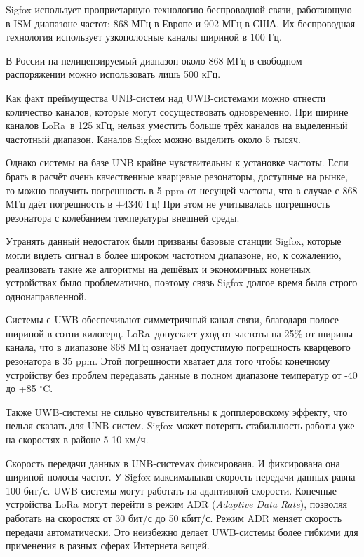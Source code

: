 Sigfox использует проприетарную технологию беспроводной связи, работающую в ISM 
диапазоне частот: 868 МГц в Европе и 902 МГц в США. 
Их беспроводная технология использует узкополосные каналы шириной в 100 Гц.

В России на нелицензируемый диапазон около 868 МГц в свободном распоряжении 
можно использовать лишь 500 кГц.

Как факт преймущества UNB-систем над UWB-системами можно отнести количество 
каналов, которые могут сосуществовать одновременно. При ширине каналов 
LoRa\texttrademark~в 
125 кГц, нельзя уместить больше трёх каналов на выделенный частотный диапазон. 
Каналов Sigfox можно выделить около 5 тысяч.

Однако системы на базе UNB крайне чувствительны к установке частоты. 
Если брать в расчёт очень качественные кварцевые резонаторы, доступные на 
рынке, то можно получить погрешность в 5 ppm от несущей частоты, что в случае с 
868 МГц даёт погрешность в $\pm 4340$ Гц! При этом не учитывалась погрешность 
резонатора с колебанием температуры внешней среды. 

Утранять данный недостаток были призваны базовые станции Sigfox, которые могли 
видеть сигнал в более широком частотном диапазоне, но, к сожалению, реализовать 
такие же алгоритмы на дешёвых и экономичных конечных устройствах было 
проблематично, поэтому связь Sigfox долгое время была строго однонаправленной.

Системы с UWB обеспечивают симметричный канал связи, благодаря полосе шириной в 
сотни килогерц. 
LoRa\texttrademark~допускает уход от частоты на 25\% от ширины канала, что в 
диапазоне 868 МГц означает допустимую погрешность кварцевого резонатора в 35 
ppm. 
Этой погрешности хватает для того чтобы конечному устройству без проблем 
передавать данные в полном диапазоне температур от -40 до +85 $^\circ$C.

Также UWB-системы не сильно чувствительны к допплеровскому эффекту, что нельзя 
сказать для UNB-систем. 
Sigfox может потерять стабильность работы уже на скоростях в районе 5-10 км/ч.

Скорость передачи данных в UNB-системах фиксирована. И фиксирована она шириной 
полосы частот.
У Sigfox максимальная скорость передачи данных равна 100 бит/с.
UWB-системы могут работать на адаптивной скорости. 
Конечные устройства LoRa\texttrademark~могут перейти в режим ADR 
(\textit{Adaptive Data 
Rate}), позволяя работать на скоростях от 30 бит/с до 50 кбит/с.
Режим ADR меняет скорость передачи автоматически.
Это неизбежно делает UWB-системы более гибкими для применения в разных сферах 
Интернета вещей.

